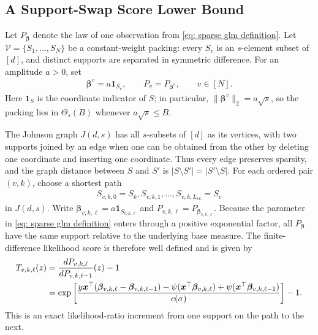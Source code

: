 \documentclass[letterpaper,12pt]{article}
\numberwithin{equation}{section}
\theoremstyle{plain}
\numberwithin{Theorem}{section}
\numberwithin{proposition}{section}
\numberwithin{Lemma}{section}
{
	\theoremstyle{definition}
	\newtheorem{Definition}{Definition}
	\newtheorem{example}{Example}
	\numberwithin{example}{section}
	\newtheorem{fact}{Fact}
	\numberwithin{fact}{section}
	\newtheorem{remark}{Remark}
}
\newcommand{\1}{\mathbbm{1}}
\def\bbeta{{\boldsymbol{\beta}}}
\begin{document}
\subsection{A Support-Swap Score Lower Bound}\label{sec: sparse glm lower bound}

Let $P_{\bbeta}$ denote the law of one observation from \eqref{eq: sparse glm definition}.  Let $\mathcal V=\{S_1,\ldots,S_N\}$ be a constant-weight packing: every $S_v$ is an $s$-element subset of $[d]$, and distinct supports are separated in symmetric difference.  For an amplitude $a>0$, set
\begin{align*}
	\bbeta^v=a\bm 1_{S_v},\qquad P_v=P_{\bbeta^v},
	\qquad v\in[N].
\end{align*}
Here $\bm1_S$ is the coordinate indicator of $S$; in particular, $\|\bbeta^v\|_2=a\sqrt{s}$, so the packing lies in $\Theta_s(B)$ whenever $a\sqrt{s}\leq B$.

The Johnson graph $J(d,s)$ has all $s$-subsets of $[d]$ as its vertices, with two supports joined by an edge when one can be obtained from the other by deleting one coordinate and inserting one coordinate.  Thus every edge preserves sparsity, and the graph distance between $S$ and $S'$ is $|S\setminus S'|=|S'\setminus S|$.  For each ordered pair $(v,k)$, choose a shortest path
\begin{align*}
	S_{v,k,0}=S_k,S_{v,k,1},\ldots,S_{v,k,L_{vk}}=S_v
\end{align*}
	in $J(d,s)$.  Write
	$\bbeta_{v,k,\ell}=a\bm 1_{S_{v,k,\ell}}$ and
	$P_{v,k,\ell}=P_{\bbeta_{v,k,\ell}}$.  Because the parameter in
	\eqref{eq: sparse glm definition} enters through a positive exponential
	factor, all $P_{\bbeta}$ have the same support relative to the underlying
	base measure.  The finite-difference likelihood score is therefore well
	defined and is given by
\begin{align}
	T_{v,k,\ell}(z)
	&=\frac{dP_{v,k,\ell}}{dP_{v,k,\ell-1}}(z)-1\notag\\
	&=\exp\left[\frac{y\bm x^\top
	(\bbeta_{v,k,\ell}-\bbeta_{v,k,\ell-1})
	-\psi(\bm x^\top\bbeta_{v,k,\ell})
	+\psi(\bm x^\top\bbeta_{v,k,\ell-1})}{c(\sigma)}\right]-1. \label{eq: support swap likelihood score}
\end{align}
This is an exact likelihood-ratio increment from one support on the path to the next.
\end{document}
